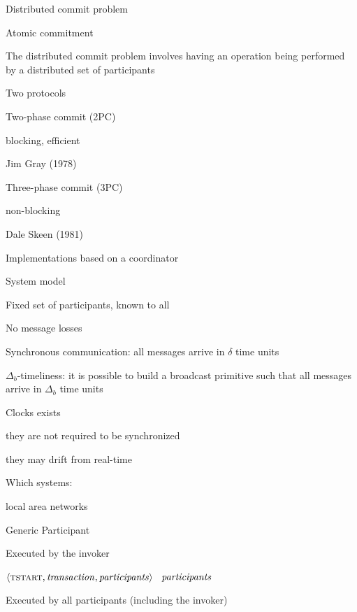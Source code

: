 \begin{frame}{Distributed commit problem}
\BI
\item \alert{Atomic commitment}
  \item The distributed commit problem involves having an operation being performed by a distributed set of participants
\item Two protocols
  \BI
  \item \alert{Two-phase commit} (2PC)
    \BI
    \item blocking, efficient
    \item Jim Gray (1978)
    \EI
  \item \alert{Three-phase commit} (3PC)
    \BI
    \item non-blocking
    \item Dale Skeen (1981)
	\EI
  \EI
\item Implementations based on a coordinator
\EI
\end{frame}

\begin{frame}{System model}
\BI
\item Fixed set of participants, known to all
\item No message losses
\item Synchronous communication: all messages arrive in $\delta$ time units
\item $\Delta_b$-timeliness: it is possible to build a broadcast primitive such that all messages arrive in $\Delta_b$ time units
\item Clocks exists
  \BI
  \item they are not required to be synchronized
  \item they may drift from real-time
  \EI
\bigskip
\item Which systems:
  \BI
  \item local area networks
  \EI
\EI
\end{frame}

\begin{frame}{Generic Participant}	
\begin{Procedure}
\caption{Executed by the invoker}
\SEND $\langle \textsc{tstart}, \mathit{transaction}, \mathit{participants} \rangle$ \TO\ $\mathit{participants}$\;
\end{Procedure}

\begin{Procedure}
\caption{Executed by all participants (including the invoker)}
\end{Procedure}
\end{frame}


